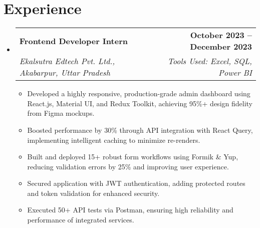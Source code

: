 \documentclass[a4paper,11pt]{article}
\makeatletter
\newcommand{\resumeItem}[1]{\item\small{{#1 \vspace{-2pt}}}}
\newcommand{\resumeSubheading}[4]{
  \vspace{-2pt}\item
    \begin{tabular*}{1.0\textwidth}[t]{l@{\extracolsep{\fill}}r}
      \textbf{#1} & \textbf{\small #2} \\
      \textit{\small#3} & \textit{\small #4} \\
    \end{tabular*}\vspace{-6pt}
}
\newcommand{\resumeItemListStart}{\begin{itemize}}
\newcommand{\resumeItemListEnd}{\end{itemize}\vspace{-5pt}}
\newcommand{\resumeSubHeadingListStart}{\begin{itemize}[leftmargin=0.0in, label={}]}
\newcommand{\resumeSubHeadingListEnd}{\end{itemize}}
\makeatother
\begin{document}
\section{Experience}
\resumeSubHeadingListStart
  \resumeSubheading
    {Frontend Developer Intern}{October 2023 -- December 2023}
    {Ekalsutra Edtech Pvt. Ltd., Akabarpur, Uttar Pradesh}{Tools Used: Excel, SQL, Power BI} 
    \resumeItemListStart
         \resumeItem{Developed a highly responsive, production-grade admin dashboard using React.js, Material UI, and Redux Toolkit, achieving 95\%+ design fidelity from Figma mockups.}
         \resumeItem{Boosted performance by 30\% through API integration with React Query, implementing intelligent caching to minimize re-renders.}
         \resumeItem{Built and deployed 15+ robust form workflows using Formik \& Yup, reducing validation errors by 25\% and improving user experience.}
         \resumeItem{Secured application with JWT authentication, adding protected routes and token validation for enhanced security.}
         \resumeItem{Executed 50+ API tests via Postman, ensuring high reliability and performance of integrated services.}
    \resumeItemListEnd
\resumeSubHeadingListEnd

\end{document}
